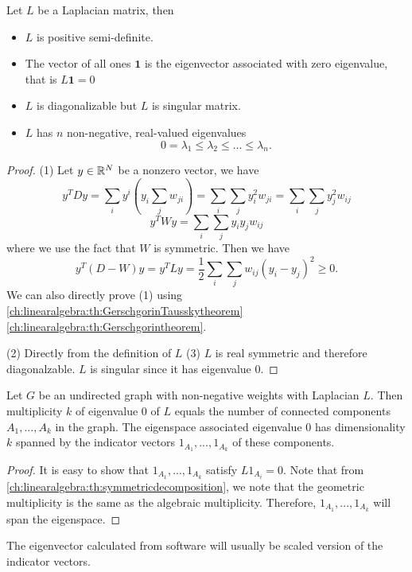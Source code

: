 \begin{refsection}
\begin{lemma}
\cite[140]{vidal2016generalized}\cite{von2007tutorial}Let $L$ be a Laplacian matrix, then
\begin{itemize}
    \item $L$ is positive semi-definite.
    \item The vector of all ones $\bm{1}$ is the eigenvector associated with zero eigenvalue, that is $L\bm{1} = 0$
    \item $L$ is diagonalizable but $L$ is singular matrix.
    \item $L$ has $n$ non-negative, real-valued eigenvalues $$0 = \lambda_1 \leq \lambda_2 \leq \dots \leq \lambda_n.$$
\end{itemize}
\end{lemma}
\begin{proof}
(1) Let $y\in \mathbb{R}^N$ be a nonzero vector, we have
$$y^TDy = \sum_{i}y^i(y_i\sum_j w_{ji})=\sum_{i}\sum_{j}y^2_i w_{ji} = \sum_{i}\sum_{j}y^2_j w_{ij}$$
$$y^TWy=\sum_{i}\sum_{j}y_iy_j w_{ij}$$
where we use the fact that $W$ is symmetric. Then we have
$$y^T(D-W)y=y^TLy = \frac{1}{2}\sum_{i}\sum_{j}w_{ij}(y_i-y_j)^2 \geq 0.$$
We can also directly prove (1) using \autoref{ch:linearalgebra:th:GerschgorinTausskytheorem}\autoref{ch:linearalgebra:th:Gerschgorintheorem}.

(2) Directly from the definition of $L$
(3) $L$ is real symmetric and therefore diagonalzable. $L$ is singular since it has eigenvalue 0.
\end{proof}  


\begin{lemma}\cite{von2007tutorial}
Let $G$ be an undirected graph with non-negative weights with Laplacian $L$. Then multiplicity $k$ of eigenvalue 0 of $L$ equals the number of connected components $A_1,...,A_k$ in the graph. The eigenspace associated eigenvalue 0 has dimensionality $k$ spanned by the indicator vectors $1_{A_1},...,1_{A_k}$ of these components.  
\end{lemma}
\begin{proof}
It is easy to show that $1_{A_1},...,1_{A_k}$ satisfy $L1_{A_i} = 0$. Note that from  \autoref{ch:linearalgebra:th:symmetricdecomposition}, we note that the geometric multiplicity is the same as the algebraic multiplicity. Therefore,  $1_{A_1},...,1_{A_k}$ will span the eigenspace. 
\end{proof}

\begin{remark}[eigenvectors]
The eigenvector calculated from software will usually be scaled version of the indicator vectors. 
\end{remark}



\end{refsection}

